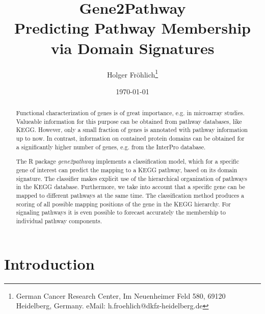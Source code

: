 \documentclass[11pt,a4paper]{article}
\begin{document}
\title{Gene2Pathway\\Predicting Pathway Membership via Domain Signatures}
\author{Holger Fr\"ohlich\footnote{German Cancer Research Center, Im Neuenheimer Feld 580, 69120 Heidelberg, Germany. eMail: h.froehlich@dkfz-heidelberg.de}}
\date{\today}
\maketitle

\begin{abstract}
Functional characterization of genes is of great importance, e.g. in microarray studies. Valueable information for this purpose can be obtained from pathway databases, like KEGG. However, only a small fraction of genes is annotated with pathway information up to now. In contrast, information on contained protein domains can be obtained for a significantly higher number of genes, e.g. from the InterPro database. 

The R package \emph{gene2pathway} implements a classification model, which for a specific gene of interest can predict the mapping to a KEGG pathway, based on its domain signature. The classifier makes explicit use of the hierarchical organization of pathways in the KEGG database. Furthermore, we take into account that a specific gene can be mapped to different pathways at the same time. The classification method produces a scoring of all possible mapping positions of the gene in the KEGG hierarchy. For signaling pathways it is even possible to forecast accurately the membership to individual pathway components. 
\end{abstract}

\section{Introduction}
\end{document}
